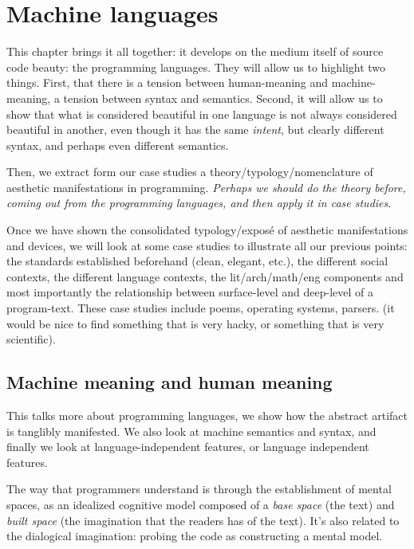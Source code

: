 \chapter{Machine languages}
\label{chap:programming}

This chapter brings it all together: it develops on the medium itself of source code beauty: the programming languages. They will allow us to highlight two things. First, that there is a tension between human-meaning and machine-meaning, a tension between syntax and semantics. Second, it will allow us to show that what is considered beautiful in one language is not always considered beautiful in another, even though it has the same \emph{intent}, but clearly different syntax, and perhaps even different semantics.

Then, we extract form our case studies a theory/typology/nomenclature of aesthetic manifestations in programming. \emph{Perhaps we should do the theory before, coming out from the programming languages, and then apply it in case studies}.

Once we have shown the consolidated typology/exposé of aesthetic manifestations and devices, we will look at some case studies to illustrate all our previous points: the standards established beforehand (clean, elegant, etc.), the different social contexts, the different language contexts, the lit/arch/math/eng components and most importantly the relationship between surface-level and deep-level of a program-text. These case studies include poems, operating systems, parsers. (it would be nice to find something that is very hacky, or something that is very scientific).

\section{Machine meaning and human meaning}
\label{sec:human-machine-meaning}

This talks more about programming languages, we show how the abstract artifact is tanglibly manifested. We also look at machine semantics and syntax, and finally we look at language-independent features, or language independent features.

The way that programmers understand is through the establishment of mental spaces, as an idealized cognitive model composed of a \emph{base space} (the text) and \emph{built space} (the imagination that the readers has of the text). It's also related to the dialogical imagination: probing the code as constructing a mental model.

